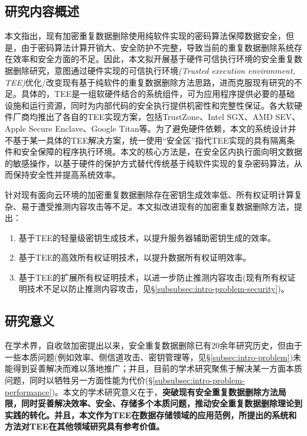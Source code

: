 \subsection{研究内容概述}
\label{subsec:intro-content}

本文指出，现有加密重复数据删除使用纯软件实现的密码算法保障数据安全，但是，由于密码算法计算开销大、安全防护不完整，导致当前的重复数据删除系统存在效率和安全方面的不足。因此，本文拟开展基于硬件可信执行环境的安全重复数据删除研究，意图通过硬件实现的可信执行环境\textit{(Trusted execution environment, TEE)}优化/改变现有基于纯软件的重复数据删除方法思路，进而克服现有研究的不足。具体的，TEE是一组软硬件结合的系统组件，可为应用程序提供必要的基础设施和运行资源，同时为内部代码的安全执行提供机密性和完整性保证。各大软硬件厂商均推出了各自的TEE实现方案，包括TrustZone、Intel SGX、AMD SEV、Apple Secure Enclave、Google Titan等。为了避免硬件依赖，本文的系统设计并不基于某一具体的TEE解决方案，统一使用“安全区”指代TEE实现的具有隔离条件和安全保障的程序执行环境。本文的核心方法是，在安全区内执行面向明文数据的敏感操作，以基于硬件的保护方式替代传统基于纯软件实现的复杂密码算法，从而保持安全性并提高系统效率。

针对现有面向云环境的加密重复数据删除存在密钥生成效率低、所有权证明计算复杂、易于遭受推测内容攻击等不足。本文拟改进现有的加密重复数据删除方法，提出：

\begin{enumerate}[leftmargin=0em]
    \item 基于TEE的轻量级密钥生成技术，以提升服务器辅助密钥生成的效率。
    \item 基于TEE的高效所有权证明技术，以提升数据所有权证明效率。
    \item 基于TEE的扩展所有权证明技术，以进一步防止推测内容攻击(现有所有权证明技术不足以防止推测内容攻击，见\S\ref{subsubsec:intro-problem-security})。
\end{enumerate}

\subsection{研究意义}
\label{subsec:intro-meaning}

在学术界，自收敛加密提出以来，安全重复数据删除已有20余年研究历史，但由于一些本质问题(例如效率、侧信道攻击、密钥管理等，见\S\ref{subsec:intro-problem})未能得到妥善解决而难以落地推广；并且，目前的学术研究聚焦于解决某一方面本质问题，同时以牺牲另一方面性能为代价(\S\ref{subsubsec:intro-problem-performance})。本文的学术研究意义在于，\textbf{突破现有安全重复数据删除方法局限，同时妥善解决效率、安全、存储多个本质问题，推动安全重复数据删除理论到实践的转化。并且，本文作为TEE在数据存储领域的应用范例，所提出的系统和方法对TEE在其他领域研究具有参考价值。}

